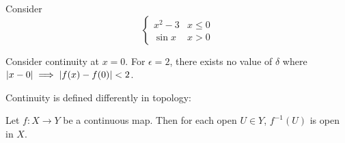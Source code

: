 \documentclass[10pt]{article}
\begin{document}
\begin{example}
Consider
\[ \begin{cases} 
      x^2 - 3 & x\leq 0 \\
			\sin x & x > 0
   \end{cases}
\]

Consider continuity at $x = 0$. For $\epsilon = 2$, there exists no value of
$\delta$ where $\lvert x - 0\rvert \implies \lvert f(x) - f(0)\rvert < 2$.
\end{example}


Continuity is defined differently in topology:

\begin{definition}
	Let $f: X \to Y$ be a continuous map. Then for each open $U\in Y$,
	$f^{-1}(U)$ is open in $X$.
\end{definition}
\end{document}
